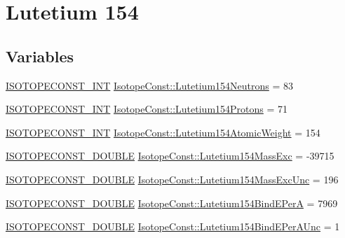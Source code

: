 \hypertarget{group___isotope_const-_lutetium-_lu154}{}\section{Lutetium 154}
\label{group___isotope_const-_lutetium-_lu154}
\subsection*{Variables}
\begin{DoxyCompactItemize}
\item 
\mbox{\hyperlink{group___isotope_const-_macros_ga5f18360b3e99483a35c32d789e62621c}{I\+S\+O\+T\+O\+P\+E\+C\+O\+N\+S\+T\+\_\+\+I\+NT}} \mbox{\hyperlink{group___isotope_const-_lutetium-_lu154_ga9bb369c4fb70ddbb59085b969bde504e}{Isotope\+Const\+::\+Lutetium154\+Neutrons}} = 83
\item 
\mbox{\hyperlink{group___isotope_const-_macros_ga5f18360b3e99483a35c32d789e62621c}{I\+S\+O\+T\+O\+P\+E\+C\+O\+N\+S\+T\+\_\+\+I\+NT}} \mbox{\hyperlink{group___isotope_const-_lutetium-_lu154_gac3351606829e3d8861de085b2d78860b}{Isotope\+Const\+::\+Lutetium154\+Protons}} = 71
\item 
\mbox{\hyperlink{group___isotope_const-_macros_ga5f18360b3e99483a35c32d789e62621c}{I\+S\+O\+T\+O\+P\+E\+C\+O\+N\+S\+T\+\_\+\+I\+NT}} \mbox{\hyperlink{group___isotope_const-_lutetium-_lu154_ga30a6e579147bd1c53a53e8fc22613140}{Isotope\+Const\+::\+Lutetium154\+Atomic\+Weight}} = 154
\item 
\mbox{\hyperlink{group___isotope_const-_macros_ga8f45a7272ce02c0b4c65c44636ed719a}{I\+S\+O\+T\+O\+P\+E\+C\+O\+N\+S\+T\+\_\+\+D\+O\+U\+B\+LE}} \mbox{\hyperlink{group___isotope_const-_lutetium-_lu154_ga75bce4245e8edf36b953ec2b16579a77}{Isotope\+Const\+::\+Lutetium154\+Mass\+Exc}} = -\/39715
\item 
\mbox{\hyperlink{group___isotope_const-_macros_ga8f45a7272ce02c0b4c65c44636ed719a}{I\+S\+O\+T\+O\+P\+E\+C\+O\+N\+S\+T\+\_\+\+D\+O\+U\+B\+LE}} \mbox{\hyperlink{group___isotope_const-_lutetium-_lu154_ga82db404cc0a63f4e77eaaa1d6ec9cb2f}{Isotope\+Const\+::\+Lutetium154\+Mass\+Exc\+Unc}} = 196
\item 
\mbox{\hyperlink{group___isotope_const-_macros_ga8f45a7272ce02c0b4c65c44636ed719a}{I\+S\+O\+T\+O\+P\+E\+C\+O\+N\+S\+T\+\_\+\+D\+O\+U\+B\+LE}} \mbox{\hyperlink{group___isotope_const-_lutetium-_lu154_ga9754d0f94f720325cf987d47abf217bd}{Isotope\+Const\+::\+Lutetium154\+Bind\+E\+PerA}} = 7969
\item 
\mbox{\hyperlink{group___isotope_const-_macros_ga8f45a7272ce02c0b4c65c44636ed719a}{I\+S\+O\+T\+O\+P\+E\+C\+O\+N\+S\+T\+\_\+\+D\+O\+U\+B\+LE}} \mbox{\hyperlink{group___isotope_const-_lutetium-_lu154_ga3badd20acd971b6e4cc24c9166435074}{Isotope\+Const\+::\+Lutetium154\+Bind\+E\+Per\+A\+Unc}} = 1

\end{DoxyCompactItemize}
